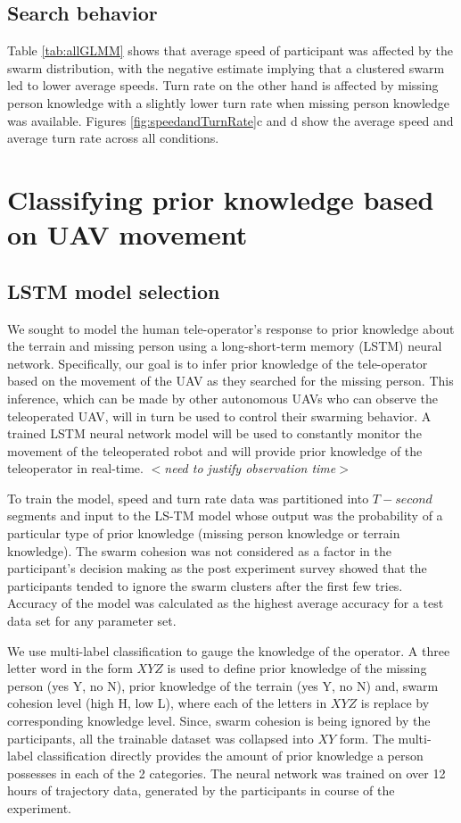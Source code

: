 \documentclass{article}
\begin{document}
\subsection{Search behavior}
	
	
Table \ref{tab:allGLMM} shows that average speed of participant was affected by the swarm distribution, with the negative estimate implying that a clustered swarm led to lower average speeds. Turn rate on the other hand is affected by missing person knowledge with a slightly lower turn rate when missing person knowledge was available. Figures \ref{fig:speedandTurnRate}c and d show the average speed and average turn rate across all conditions.
	


\clearpage

\section{Classifying prior knowledge based on UAV movement} \label{sec:LSTM}
\subsection{LSTM model selection}
We sought to model the human tele-operator's response to  prior knowledge about the terrain and missing person using a long-short-term memory (LSTM) neural network. Specifically, our goal is to infer prior knowledge of the tele-operator based on the movement of the UAV as they searched for the missing person. This inference, which can be made by other autonomous UAVs who can observe the teleoperated UAV, will in turn be used to control their swarming behavior. A trained LSTM neural network model will be used to constantly monitor the movement of the teleoperated robot and will provide prior knowledge of the teleoperator in real-time. 
\textit{$<$need to justify observation time$>$}

To train the model, speed and turn rate data was partitioned into $T-second$ segments and input to the LS-TM model whose output was the probability of a particular type of prior knowledge (missing person knowledge or terrain knowledge). The swarm cohesion was not considered as a factor in the participant's decision making as the post experiment survey showed that the participants tended to ignore the swarm clusters after the first few tries. Accuracy of the model was calculated as the highest average accuracy for a test data set for any parameter set. 

We use multi-label classification to gauge the knowledge of the operator. A three letter word in the form $XYZ$ is used to define prior knowledge of the missing person (yes Y, no N), prior knowledge of the terrain (yes Y, no N) and, swarm cohesion level (high H, low L), where each of the letters in $XYZ$ is replace by corresponding knowledge level. Since, swarm cohesion is being ignored by the participants, all the trainable dataset was collapsed into $XY$ form. The multi-label classification directly provides the amount of prior knowledge a person possesses in each of the 2 categories. The neural network was trained on over 12 hours of trajectory data, generated by the participants in course of the experiment.
\end{document}
